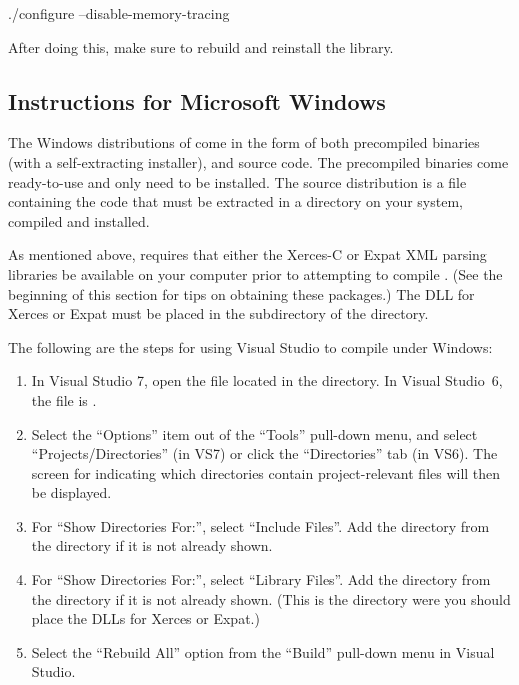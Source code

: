 \documentclass{sbmlmanual}
\begin{document}
\begin{shellVerbatim}
  ./configure --disable-memory-tracing
\end{shellVerbatim}

After doing this, make sure to rebuild and reinstall the \libsbml{} library.


\subsection{Instructions for Microsoft Windows}

The Windows distributions of \libsbml{} come in the form of both
precompiled binaries (with a self-extracting installer), and source code.
The precompiled binaries come ready-to-use and only need to be installed.
The source distribution is a  file containing the \libsbml{}
code that must be extracted in a directory on your system, compiled and
installed.

As mentioned above, \libsbml{} requires that either the Xerces-C or Expat
XML parsing libraries be available on your computer prior to attempting to
compile \libsbml{}.  (See the beginning of this section for tips on
obtaining these packages.)  The DLL for Xerces or Expat must be placed in
the  subdirectory of the \libsbml{} directory.

The following are the steps for using Visual Studio to compile \libsbml{}
under Windows:

\begin{enumerate}
  
\item In Visual Studio 7, open the file 
  located in the \libsbml{} directory.  In Visual Studio~6, the file is
  .
  
\item Select the ``Options'' item out of the ``Tools'' pull-down menu, and
  select ``Projects/Directories'' (in VS7) or click the ``Directories'' tab
  (in VS6).  The screen for indicating which directories contain
  project-relevant files will then be displayed.
  
\item For ``Show Directories For:'', select ``Include Files''.
  Add the  directory from the \libsbml{} directory if
  it is not already shown.
  
\item For ``Show Directories For:'', select ``Library Files''.  Add the
   directory from the \libsbml{} directory if it is not
  already shown.  (This is the directory were you should place the DLLs for
  Xerces or Expat.)
  
\item Select the ``Rebuild All'' option from the ``Build'' pull-down menu
  in Visual Studio.

\end{enumerate}
\end{document}
